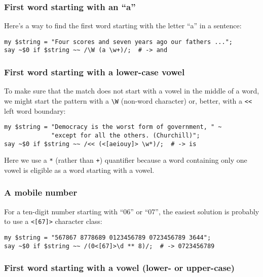 \subsubsection{First word starting with an ``a''}

Here's a way to find the first word starting with the letter 
``a'' in a sentence:

\begin{verbatim}
my $string = "Four scores and seven years ago our fathers ...";
say ~$0 if $string ~~ /\W (a \w+)/;  # -> and
\end{verbatim}

\subsubsection{First word starting with a lower-case vowel}

To make sure that the match does not start with a vowel in 
the middle of a word, we might start the pattern with a 
\verb'\W' (non-word character) or, better, with a \verb'<<' 
left word boundary:

\begin{verbatim}
my $string = "Democracy is the worst form of government, " ~
             "except for all the others. (Churchill)";
say ~$0 if $string ~~ /<< (<[aeiouy]> \w*)/;  # -> is
\end{verbatim}

Here we use a \verb'*' (rather than \verb'+') quantifier 
because a word containing only one vowel is eligible as 
a word starting with a vowel.

\subsubsection{A mobile number}

For a ten-digit number starting with ``06'' or ``07'', the 
easiest solution is probably to use a \verb'<[67]>' character 
class:

\begin{verbatim}
my $string = "567867 8778689 0123456789 0723456789 3644";
say ~$0 if $string ~~ /(0<[67]>\d ** 8)/;  # -> 0723456789
\end{verbatim}

\subsubsection{First word starting with a vowel (lower- or upper-case)}

